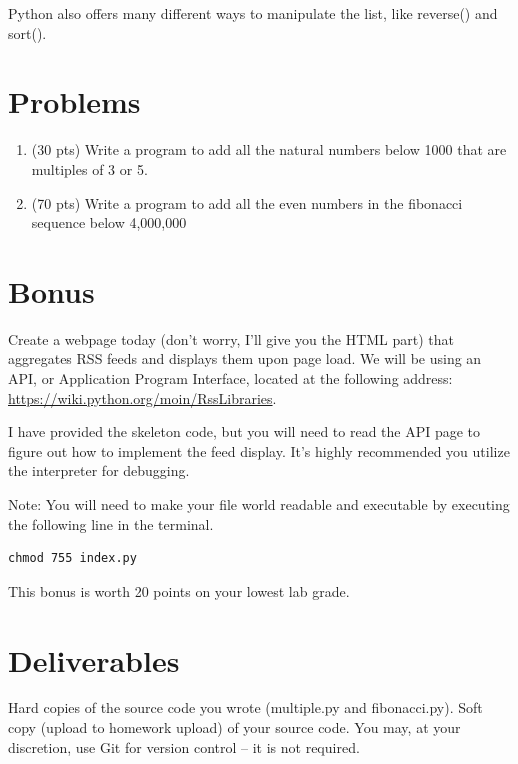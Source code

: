 \documentclass[letterpaper,12pt]{article}
\begin{document}
Python also offers many different ways to manipulate the list, like reverse() and sort().

\section*{Problems}
\begin{enumerate}
    \item (30 pts) Write a program to add all the natural numbers below 1000 that are multiples of 3 or 5.
    \item (70 pts) Write a program to add all the even numbers in the fibonacci sequence below 4,000,000
\end{enumerate}

\section*{Bonus}
Create a webpage today (don't worry, I'll give you the HTML part)
that aggregates RSS feeds and displays them upon page load. We will be using an API, or Application
Program Interface, located at the following address: \url{https://wiki.python.org/moin/RssLibraries}.

I have provided the skeleton code, but you will need to read the API page to figure out how to implement
the feed display. It's highly recommended you utilize the interpreter for debugging.

Note: You will need to make your file world readable and executable by executing the following line in the terminal.
\begin{lstlisting}
chmod 755 index.py
\end{lstlisting}

This bonus is worth 20 points on your lowest lab grade.

\section*{Deliverables}
Hard copies of the source code you wrote (multiple.py and fibonacci.py). Soft copy (upload to homework upload) of
your source code. You may, at your discretion, use Git for version control -- it is not required.
\end{document}
